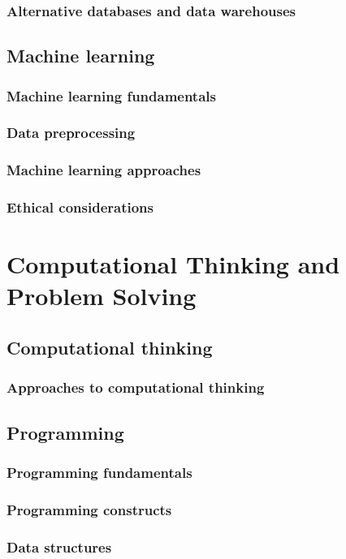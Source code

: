\documentclass[a4paper,12pt]{article}
\begin{document}
\subsubsection{Alternative databases and data warehouses}
\subsection{Machine learning}
\subsubsection{Machine learning fundamentals}
\subsubsection{Data preprocessing}
\subsubsection{Machine learning approaches}
\subsubsection{Ethical considerations}

\newpage
\section{Computational Thinking and Problem Solving}
\subsection{Computational thinking}
\subsubsection{Approaches to computational thinking}
\subsection{Programming}
\subsubsection{Programming fundamentals}
\subsubsection{Programming constructs}
\subsubsection{Data structures}
\end{document}
